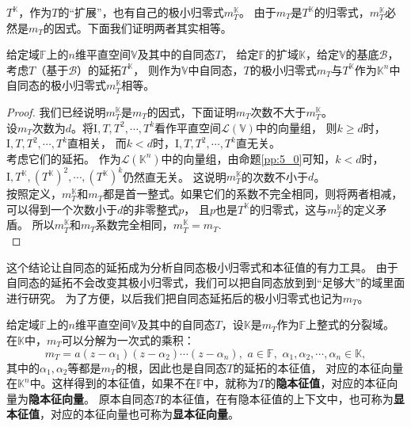 \documentclass[12pt,UTF8,fontset=none]{ctexbook}
\begin{document}
$T^{\mathbb{K}}$，作为$T$的“扩展”，也有自己的极小归零式$m_T^{\mathbb{K}}$。
由于$m_T$是$T^{\mathbb{K}}$的归零式，$m_T^{\mathbb{K}}$必然是$m_T$的因式。下面我们证明两者其实相等。

\begin{pp}\label{pp:9_6}
    给定域$\mathbb{F}$上的$n$维平直空间$\mathbb{V}$及其中的自同态$T$，
    给定$\mathbb{F}$的扩域$\mathbb{K}$，给定$\mathbb{V}$的基底$\mathcal{B}$，
    考虑$T$（基于$\mathcal{B}$）的延拓$T^{\mathbb{K}}$，
    则作为$\mathbb{V}$中自同态，$T$的极小归零式$m_T$与$T^{\mathbb{K}}$作为$\mathbb{K}^n$中自同态的极小归零式$m_T^{\mathbb{K}}$相等。
\end{pp}
\begin{proof} %
    我们已经说明$m_T^{\mathbb{K}}$是$m_T$的因式，下面证明$m_T$次数不大于$m_T^{\mathbb{K}}$。\\
    设$m_T$次数为$d$。将$\mathrm{I}, T, T^2, \cdots, T^k$看作平直空间$\mathcal{L}(\mathbb{V})$中的向量组，
    则$k \geqslant d$时，$\mathrm{I}, T, T^2, \cdots, T^k$直相关，
    而$k < d$时，$\mathrm{I}, T, T^2, \cdots, T^{k}$直无关。\\
    考虑它们的延拓。
    作为$\mathcal{L}(\mathbb{K}^n)$中的向量组，由命题\ref{pp:5_0}可知，$k < d$时，
    $\mathrm{I}, T^{\mathbb{K}}, \left(T^{\mathbb{K}}\right)^2, \cdots, \left(T^{\mathbb{K}}\right)^{k}$仍然直无关。
    这说明$m_T^{\mathbb{K}}$的次数不小于$d$。\\
    按照定义，$m_T^{\mathbb{K}}$和$m_T$都是首一整式。如果它们的系数不完全相同，则将两者相减，可以得到一个次数小于$d$的非零整式$p$，
    且$p$也是$T^{\mathbb{K}}$的归零式，这与$m_T^{\mathbb{K}}$的定义矛盾。
    所以$m_T^{\mathbb{K}}$和$m_T$系数完全相同，$m_T^{\mathbb{K}} = m_T$.\\
\end{proof}


这个结论让自同态的延拓成为分析自同态极小归零式和本征值的有力工具。
由于自同态的延拓不会改变其极小归零式，我们可以把自同态放到到“足够大”的域里面进行研究。
为了方便，以后我们把自同态延拓后的极小归零式也记为$m_T$。

给定域$\mathbb{F}$上的$n$维平直空间$\mathbb{V}$及其中的自同态$T$，设$\mathbb{K}$是$m_T$作为$\mathbb{F}$上整式的分裂域。
在$\mathbb{K}$中，$m_T$可以分解为一次式的乘积：
$$ m_T = a(z - \alpha_1)(z - \alpha_2)\cdots(z - \alpha_n), \,\, a \in \mathbb{F}, \,\, \alpha_1, \alpha_2, \cdots ,  \alpha_n \in \mathbb{K}, $$
其中的$\alpha_1, \alpha_2$等都是$m_T$的根，因此也是自同态$T$的延拓的本征值，
对应的本征向量在$\mathbb{K}^n$中。这样得到的本征值，如果不在$\mathbb{F}$中，就称为$T$的\textbf{隐本征值}，对应的本征向量为\textbf{隐本征向量}。
原本自同态$T$的本征值，在有隐本征值的上下文中，也可称为\textbf{显本征值}，对应的本征向量也可称为\textbf{显本征向量}。
\end{document}
